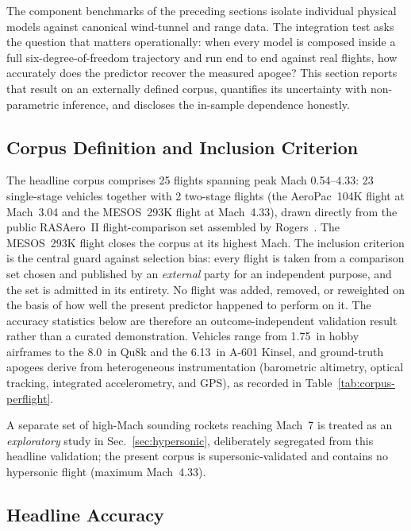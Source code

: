 
The component benchmarks of the preceding sections isolate individual physical
models against canonical wind-tunnel and range data. The integration test asks
the question that matters operationally: when every model is composed inside a
full six-degree-of-freedom trajectory and run end to end against real flights,
how accurately does the predictor recover the measured apogee? This section
reports that result on an externally defined corpus, quantifies its uncertainty
with non-parametric inference, and discloses the in-sample dependence honestly.

\subsection{Corpus Definition and Inclusion Criterion}
\label{sec:corpus-def}

The headline corpus comprises \num{25} flights spanning peak Mach
\numrange{0.54}{4.33}: \num{23} single-stage vehicles together with \num{2}
two-stage flights (the AeroPac~104K flight at Mach~3.04 and the MESOS~293K
flight at Mach~4.33), drawn directly from the public RASAero~II
flight-comparison set assembled by Rogers~\cite{rogers2015,
rogers_rasaero_alt}. The MESOS~293K flight closes the corpus at its highest
Mach. The inclusion criterion is the central guard against
selection bias: every flight is taken from a comparison set chosen and published
by an \emph{external} party for an independent purpose, and the set is admitted
in its entirety. No flight was added, removed, or reweighted on the basis of how
well the present predictor happened to perform on it. The accuracy statistics
below are therefore an outcome-independent validation result rather than a
curated demonstration. Vehicles range from \SI{1.75}{in} hobby airframes to the
\SI{8.0}{in} Qu8k and the \SI{6.13}{in} A-601 Kinsel, and ground-truth apogees
derive from heterogeneous instrumentation (barometric altimetry, optical
tracking, integrated accelerometry, and GPS), as recorded in
Table~\ref{tab:corpus-perflight}.

A separate set of high-Mach sounding rockets reaching Mach~7 is treated as an
\emph{exploratory} study in Sec.~\ref{sec:hypersonic}, deliberately segregated
from this headline validation; the present corpus is supersonic-validated and
contains no hypersonic flight (maximum Mach~4.33).

\subsection{Headline Accuracy}
\label{sec:corpus-headline}

